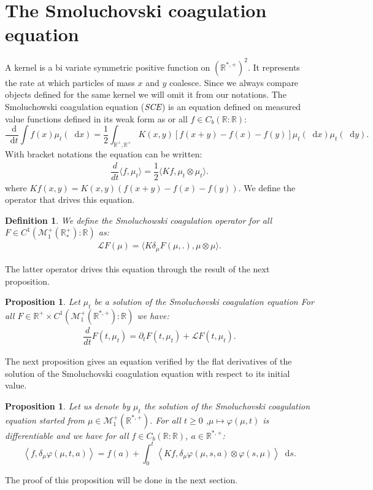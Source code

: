 \documentclass[11pt,a4paper]{article}
\newcommand{\RR}{\mathbb{R}}
\newcommand{\RRP}{\mathbb{R}^+_*}
\newcommand{\MC}{\mathcal{M}}
\newcommand{\LC}{\mathcal{L}}
\newcommand{\SCE}{\emph{SCE}}
\newcommand{\dd}{\mathop{}\!\mathrm{d}}
\newtheorem{proposition}[theorem]{Proposition}
\newtheorem{definition}[theorem]{Definition}
\begin{document}
\section{The Smoluchovski coagulation equation}
A kernel is a bi variate symmetric positive function on $(\RR^{*,+})^2$. It represents the rate at which particles of mass $x$ and $y$ coalesce. Since we always compare objects defined for the same kernel we will omit it from our notations. The Smoluchowski coagulation equation ($\SCE$) is an equation defined on measured value functions defined in its weak form as or all $f \in C_b(\RR:\RR)$:
\begin{equation}\label{eq:SCE}
    \dfrac{\dd}{\dd t}\int f(x)\mu_t (\dd x) = \dfrac12\int_{\RR^+, \RR^+} 
        K(x,y)\left[f(x+y) - f(x) - f(y)\right] \mu_t(\dd x)\mu_t(\dd y).
\end{equation}
With bracket notations the equation can be written:
\begin{align*}
    \dfrac{d}{dt}\langle f,\mu_t \rangle = \dfrac12\langle Kf , \mu_t \otimes \mu_t\rangle.
\end{align*}
where $Kf(x,y) = K(x,y)\left(f(x+y) - f(x) - f(y) \right)$. We define the operator that drives this equation.
\begin{definition}
    We define the Smoluchowski coagulation operator for all $F \in C^1(\MC^+_1\left(\RRP\right):\RR)$ as:
    \begin{align*}
        \LC F(\mu) = \langle K\delta_\mu F(\mu,.) , \mu\otimes \mu\rangle.
    \end{align*}
\end{definition}
The latter operator drives this equation through the result of the next proposition.
\begin{proposition}
    Let $\mu_t$ be a solution of the Smoluchovski coagulation equation For all $F \in \RR^+ \times C^1(\MC_1^+\left(\RR^{*,+} \right):\RR)$ we have:
    \begin{align*}
        \dfrac{d}{dt} F(t, \mu_t) = \partial_t F(t, \mu_t) + \LC F(t,\mu_t).
    \end{align*}
\end{proposition}
The next proposition gives an equation verified by the flat derivatives of the solution of the Smoluchovski coagulation equation with respect to its initial value.
\begin{proposition}\label{prop:smol_derivative_equation}
    Let us denote by $\mu_t$ the solution of the Smoluchovski coagulation equation started from $\mu \in \MC_1^+\left(\RR^{*,+}\right)$. For all $t\geq 0$ ,\(\mu \mapsto \varphi(\mu,t)\) is differentiable and we have for all $f \in C_b(\RR:\RR)$, $a\in \RR^{*,+}$:
\begin{equation}\label{eq:smol_first_derivative}
        \left\langle f, \delta_\mu \varphi(\mu,t,a)\right\rangle
        = f(a) + \int_0^t \left\langle Kf, \delta_\mu \varphi(\mu,s,a) \otimes \varphi(s,\mu)\right\rangle\dd s.
    \end{equation}
\end{proposition}
The proof of this proposition will be done in the next section. 
\end{document}
